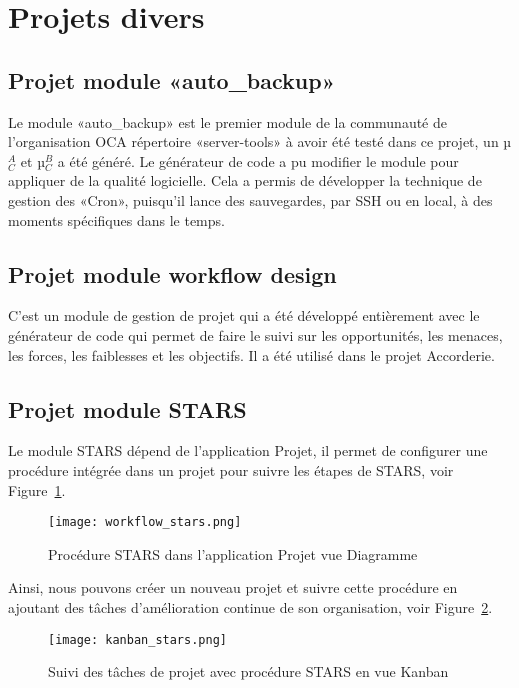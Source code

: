 \section{Projets divers}

\subsection{Projet module «auto\_backup»}

Le module «auto\_backup» est le premier module de la communauté de l'organisation OCA répertoire «server-tools» à avoir été testé dans ce projet, un µ$_C^A$ et µ$_C^B$ a été généré. Le générateur de code a pu modifier le module pour appliquer de la qualité logicielle. Cela a permis de développer la technique de gestion des «Cron», puisqu’il lance des sauvegardes, par SSH ou en local, à des moments spécifiques dans le temps.

\subsection{Projet module workflow design}

C’est un module de gestion de projet qui a été développé entièrement avec le générateur de code qui permet de faire le suivi sur les opportunités, les menaces, les forces, les faiblesses et les objectifs. Il a été utilisé dans le projet Accorderie.

\subsection{Projet module STARS}

Le module STARS dépend de l’application Projet, il permet de configurer une procédure intégrée dans un projet pour suivre les étapes de STARS, voir Figure~\ref{fig:workflow_stars}.

\begin{figure}
\centering
\texttt{[image: workflow\_stars.png]}
\caption{Procédure STARS dans l'application Projet vue Diagramme}
\label{fig:workflow_stars}
\end{figure}

Ainsi, nous pouvons créer un nouveau projet et suivre cette procédure en ajoutant des tâches d'amélioration continue de son organisation, voir Figure~\ref{fig:kanban_stars}.

\begin{figure}
\centering
\texttt{[image: kanban\_stars.png]}
\caption{Suivi des tâches de projet avec procédure STARS en vue Kanban}
\label{fig:kanban_stars}
\end{figure}

